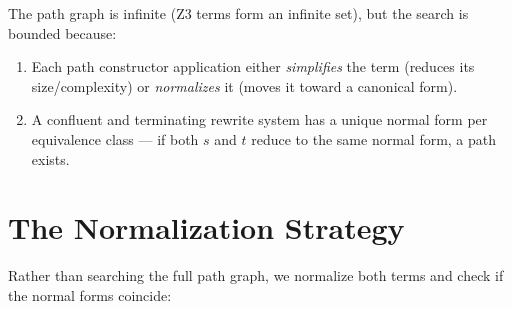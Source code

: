 The path graph is infinite (Z3 terms form an infinite set), but
the search is bounded because:
\begin{enumerate}
  \item Each path constructor application either \emph{simplifies}
    the term (reduces its size/complexity) or \emph{normalizes} it
    (moves it toward a canonical form).
  \item A confluent and terminating rewrite system has a unique
    normal form per equivalence class --- if both $s$ and $t$ reduce
    to the same normal form, a path exists.
\end{enumerate}

\section{The Normalization Strategy}

Rather than searching the full path graph, we normalize both terms
and check if the normal forms coincide:

